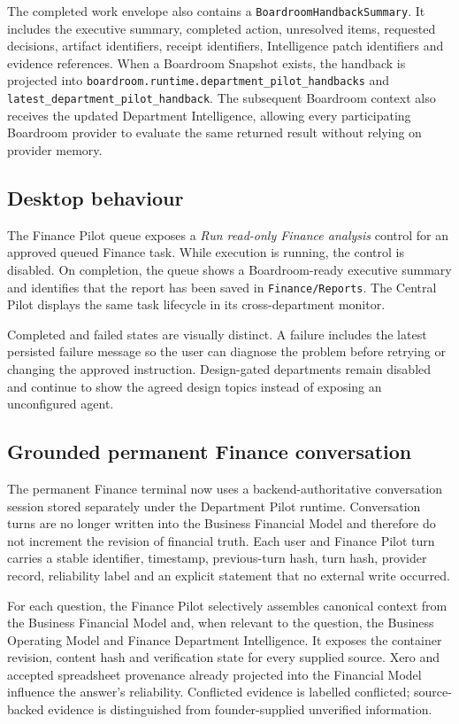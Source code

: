 The completed work envelope also contains a \texttt{BoardroomHandbackSummary}.  It includes the executive summary, completed action, unresolved items, requested decisions, artifact identifiers, receipt identifiers, Intelligence patch identifiers and evidence references.  When a Boardroom Snapshot exists, the handback is projected into \texttt{boardroom.runtime.department\_pilot\_handbacks} and \texttt{latest\_department\_pilot\_handback}.  The subsequent Boardroom context also receives the updated Department Intelligence, allowing every participating Boardroom provider to evaluate the same returned result without relying on provider memory.

\subsection{Desktop behaviour}

The Finance Pilot queue exposes a \emph{Run read-only Finance analysis} control for an approved queued Finance task.  While execution is running, the control is disabled.  On completion, the queue shows a Boardroom-ready executive summary and identifies that the report has been saved in \texttt{Finance/Reports}.  The Central Pilot displays the same task lifecycle in its cross-department monitor.

Completed and failed states are visually distinct.  A failure includes the latest persisted failure message so the user can diagnose the problem before retrying or changing the approved instruction.  Design-gated departments remain disabled and continue to show the agreed design topics instead of exposing an unconfigured agent.

\subsection{Grounded permanent Finance conversation}

The permanent Finance terminal now uses a backend-authoritative conversation session stored separately under the Department Pilot runtime.  Conversation turns are no longer written into the Business Financial Model and therefore do not increment the revision of financial truth.  Each user and Finance Pilot turn carries a stable identifier, timestamp, previous-turn hash, turn hash, provider record, reliability label and an explicit statement that no external write occurred.

For each question, the Finance Pilot selectively assembles canonical context from the Business Financial Model and, when relevant to the question, the Business Operating Model and Finance Department Intelligence.  It exposes the container revision, content hash and verification state for every supplied source.  Xero and accepted spreadsheet provenance already projected into the Financial Model influence the answer's reliability.  Conflicted evidence is labelled conflicted; source-backed evidence is distinguished from founder-supplied unverified information.

